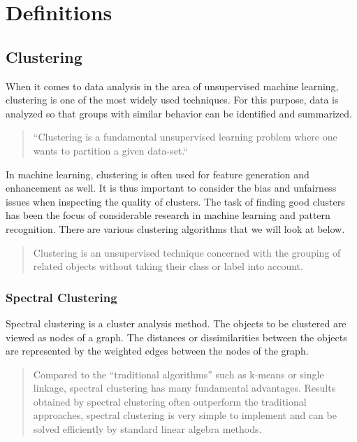 \section{Definitions}



\subsection{Clustering}

When it comes to data analysis in the area of unsupervised machine learning, clustering is one of the most widely used techniques. For this purpose, data is analyzed so that groups with similar behavior can be identified and summarized. \autocite[]{VonLuxburg2007}

\begin{quote}
    ``Clustering is a fundamental unsupervised learning problem where one wants to partition a given data-set.``

\autocite[1]{Bera2019}
\end{quote}

In machine learning, clustering is often used for feature generation and enhancement as well. It is thus important to consider the bias and unfairness issues when inspecting the quality of clusters.\autocite[]{Bera2019}
The task of finding good clusters has been the focus of considerable research in machine learning and pattern recognition.\autocite[]{Ng2001}
There are various clustering algorithms that we will look at below.

\begin{quote}
Clustering is an unsupervised technique concerned with the grouping of related objects without taking their class or label into account.

\autocite[1]{Nascimento2011}
\end{quote}


\subsubsection{Spectral Clustering}

Spectral clustering is a cluster analysis method. The objects to be clustered are viewed as nodes of a graph. The distances or dissimilarities between the objects are represented by the weighted edges between the nodes of the graph.

\begin{quote}
Compared to the “traditional algorithms” such as k-means or single linkage, spectral clustering has many fundamental advantages. Results obtained by spectral clustering often outperform the traditional approaches, spectral clustering is very simple to implement and can be solved efficiently by standard linear algebra methods.

\autocite[1]{VonLuxburg2007}
\end{quote}


